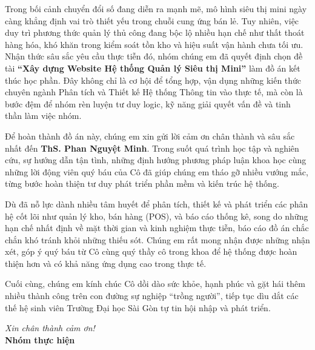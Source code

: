 \documentclass[14pt, a4paper]{extarticle}
\begin{document}
\begin{sloppypar}
Trong bối cảnh chuyển đổi số đang diễn ra mạnh mẽ, mô hình siêu thị mini ngày càng khẳng định vai trò thiết yếu trong chuỗi cung ứng bán lẻ. Tuy nhiên, việc duy trì phương thức quản lý thủ công đang bộc lộ nhiều hạn chế như thất thoát hàng hóa, khó khăn trong kiểm soát tồn kho và hiệu suất vận hành chưa tối ưu. Nhận thức sâu sắc yêu cầu thực tiễn đó, nhóm chúng em đã quyết định chọn đề tài \textbf{“Xây dựng Website Hệ thống Quản lý Siêu thị Mini”} làm đồ án kết thúc học phần. Đây không chỉ là cơ hội để tổng hợp, vận dụng những kiến thức chuyên ngành Phân tích và Thiết kế Hệ thống Thông tin vào thực tế, mà còn là bước đệm để nhóm rèn luyện tư duy logic, kỹ năng giải quyết vấn đề và tinh thần làm việc nhóm.

Để hoàn thành đồ án này, chúng em xin gửi lời cảm ơn chân thành và sâu sắc nhất đến \textbf{ThS. Phan Nguyệt Minh}. Trong suốt quá trình học tập và nghiên cứu, sự hướng dẫn tận tình, những định hướng phương pháp luận khoa học cùng những lời động viên quý báu của Cô đã giúp chúng em tháo gỡ nhiều vướng mắc, từng bước hoàn thiện tư duy phát triển phần mềm và kiến trúc hệ thống.

Dù đã nỗ lực dành nhiều tâm huyết để phân tích, thiết kế và phát triển các phân hệ cốt lõi như quản lý kho, bán hàng (POS), và báo cáo thống kê, song do những hạn chế nhất định về mặt thời gian và kinh nghiệm thực tiễn, báo cáo đồ án chắc chắn khó tránh khỏi những thiếu sót. Chúng em rất mong nhận được những nhận xét, góp ý quý báu từ Cô cùng quý thầy cô trong khoa để hệ thống được hoàn thiện hơn và có khả năng ứng dụng cao trong thực tế.

Cuối cùng, chúng em kính chúc Cô dồi dào sức khỏe, hạnh phúc và gặt hái thêm nhiều thành công trên con đường sự nghiệp “trồng người”, tiếp tục dìu dắt các thế hệ sinh viên Trường Đại học Sài Gòn tự tin hội nhập và phát triển.
\end{sloppypar}

\begin{flushright}
    \textit{Xin chân thành cảm ơn!}\\
    \textbf{Nhóm thực hiện}
\end{flushright}
\vspace{1cm}
\end{document}

